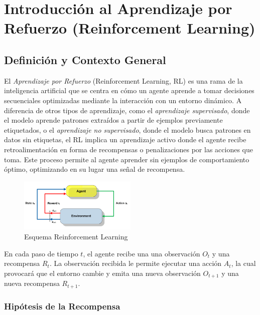 \documentclass[a4paper,12pt, twoside]{report}
\begin{document}
\section{Introducción al Aprendizaje por Refuerzo (Reinforcement Learning)}

\subsection{Definición y Contexto General}

El \textit{Aprendizaje por Refuerzo} (Reinforcement Learning, RL) es una rama de la inteligencia 
artificial que se centra en cómo un agente aprende a tomar decisiones secuenciales optimizadas 
mediante la interacción con un entorno dinámico. A diferencia de otros tipos de aprendizaje, como 
el \textit{aprendizaje supervisado}, donde el modelo aprende patrones extraídos a partir de ejemplos 
previamente etiquetados, o el \textit{aprendizaje no supervisado}, donde el modelo busca patrones 
en datos sin etiquetas, el RL implica un aprendizaje activo donde el agente recibe retroalimentación 
en forma de recompensas o penalizaciones por las acciones que toma. Este proceso permite al 
agente aprender sin ejemplos de comportamiento óptimo, optimizando en su lugar una señal de recompensa.

\begin{figure}[H]
    \centering
    \includegraphics[width=0.5\textwidth]{./figures/A-brief-schema-of-Reinforcement-Learning-26.png}
    \caption{Esquema Reinforcement Learning}
    \label{fig:RF-schema}
\end{figure}

En cada paso de tiempo \(t\), el agente recibe una una observación \(O_t\) y una recompensa \(R_t\).
La observación recibida le permite ejecutar una acción \(A_t\), la cual provocará que el entorno cambie
y emita una nueva observación \(O_{t+1}\) y una nueva recompensa \(R_{t+1}\).

\subsubsection{Hipótesis de la Recompensa}
\end{document}
